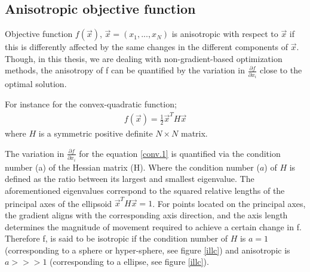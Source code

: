 
\subsection{Anisotropic objective function}
\label{IllCon}
Objective function $f(\vec{x})$, $\vec{x}=(x_1,...,x_N)$  is anisotropic with respect to $\vec{x}$ if this is differently affected by the same changes in the different components of $\vec{x}$. Though, in this thesis, we are dealing with non-gradient-based optimization methods, the anisotropy of f can be quantified by the variation in $\frac{\partial f}{\partial x_i}$ close to the optimal solution. 



For instance for  the convex-quadratic function;
\begin{eqnarray}
   f(\vec{x}) = \frac{1}{2}\vec{x}^TH\vec{x}
   \label{conv.1}
\end{eqnarray}
where $H$ is a symmetric positive definite $N \times N$ matrix. 

The variation in $\frac{\partial f}{\partial x_i}$ for the equation \ref{conv.1} is quantified via the condition number (a) of the Hessian matrix (H). Where the condition number ($a$) of $H$ is defined as the ratio between its largest and smallest eigenvalue. 
The aforementioned eigenvalues correspond to the squared relative lengths of the principal axes of the ellipsoid $\vec{x}^TH\vec{x} = 1$. For points located on the principal axes, the gradient aligns with the corresponding axis direction, and the axis length determines the magnitude of movement required to achieve a certain change in f. Therefore f, is said to be isotropic if the condition number of $H$ is $a=1$ (corresponding to a sphere or hyper-sphere, see figure \ref{illc}) and anisotropic is $a>>>1$ (corresponding to a ellipse, see figure \ref{illc}).

  


